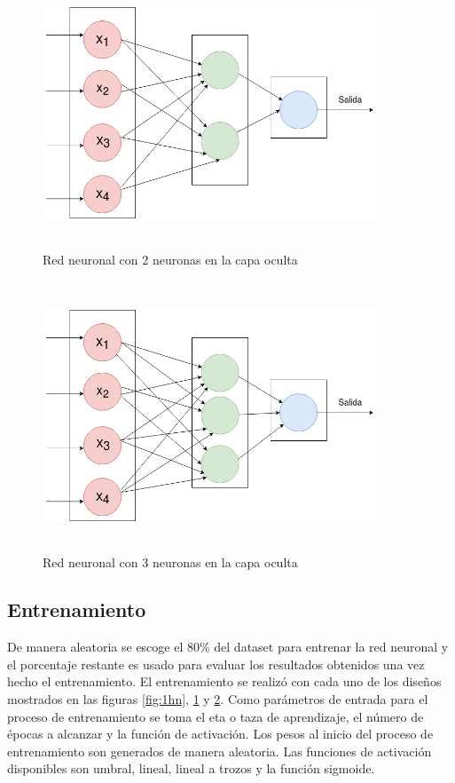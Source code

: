 \documentclass[11pt]{article}
\begin{document}
\begin{figure}[H]
    \includegraphics[width=10cm, height=8cm]{2hn}
    \centering
    \caption{Red neuronal con 2 neuronas en la capa oculta}
    \label{fig:2hn}
\end{figure}
\begin{figure}[H]
    \includegraphics[width=10cm, height=8cm]{3hn}
    \centering
    \caption{Red neuronal con 3 neuronas en la capa oculta}
    \label{fig:3hn}
\end{figure}
\subsection{Entrenamiento}
De manera aleatoria se escoge  el 80\% del dataset para entrenar la red neuronal y el porcentaje
restante es usado para evaluar los resultados obtenidos una vez hecho el entrenamiento.
El entrenamiento se realiz\'o con cada uno de los dise\~nos mostrados en las figuras \ref{fig:1hn}, \ref{fig:2hn} y \ref{fig:3hn}.
Como par\'ametros de entrada para el proceso de entrenamiento se toma el eta o taza de aprendizaje, el n\'umero de \'epocas a alcanzar y la funci\'on de activaci\'on.
Los pesos al inicio del proceso de entrenamiento son generados de manera aleatoria. Las funciones de activaci\'on disponibles son umbral, lineal, lineal a trozos y la funci\'on sigmoide.
\end{document}
